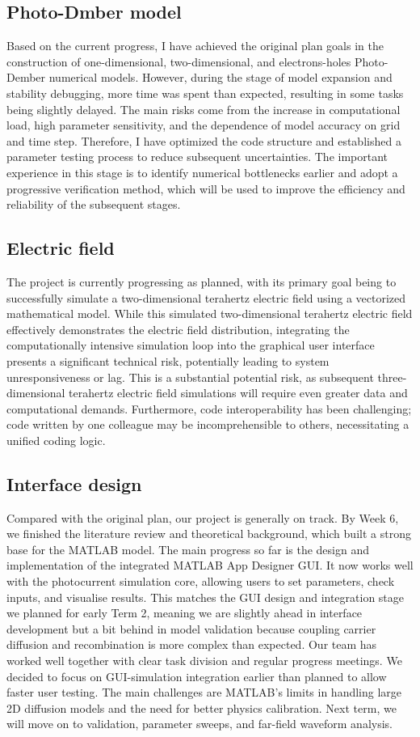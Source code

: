 \documentclass[12pt]{interim_report}
\begin{document}
\subsection{Photo-Dmber model}
Based on the current progress, I have achieved the original plan goals in the construction of one-dimensional, two-dimensional, and electrons-holes Photo-Dember numerical models. However, during the stage of model expansion and stability debugging, more time was spent than expected, resulting in some tasks being slightly delayed. The main risks come from the increase in computational load, high parameter sensitivity, and the dependence of model accuracy on grid and time step. Therefore, I have optimized the code structure and established a parameter testing process to reduce subsequent uncertainties. The important experience in this stage is to identify numerical bottlenecks earlier and adopt a progressive verification method, which will be used to improve the efficiency and reliability of the subsequent stages.
\subsection{Electric field}
The project is currently progressing as planned, with its primary goal being to successfully simulate a two-dimensional terahertz electric field using a vectorized mathematical model. While this simulated two-dimensional terahertz electric field effectively demonstrates the electric field distribution, integrating the computationally intensive simulation loop into the graphical user interface presents a significant technical risk, potentially leading to system unresponsiveness or lag. This is a substantial potential risk, as subsequent three-dimensional terahertz electric field simulations will require even greater data and computational demands. Furthermore, code interoperability has been challenging; code written by one colleague may be incomprehensible to others, necessitating a unified coding logic.
\subsection{Interface design}
Compared with the original plan, our project is generally on track. By Week 6, we finished the literature review and theoretical background, which built a strong base for the MATLAB model. The main progress so far is the design and implementation of the integrated MATLAB App Designer GUI. It now works well with the photocurrent simulation core, allowing users to set parameters, check inputs, and visualise results. This matches the GUI design and integration stage we planned for early Term 2, meaning we are slightly ahead in interface development but a bit behind in model validation because coupling carrier diffusion and recombination is more complex than expected.\newline
Our team has worked well together with clear task division and regular progress meetings. We decided to focus on GUI-simulation integration earlier than planned to allow faster user testing. The main challenges are MATLAB’s limits in handling large 2D diffusion models and the need for better physics calibration. Next term, we will move on to validation, parameter sweeps, and far-field waveform analysis.
\end{document}

